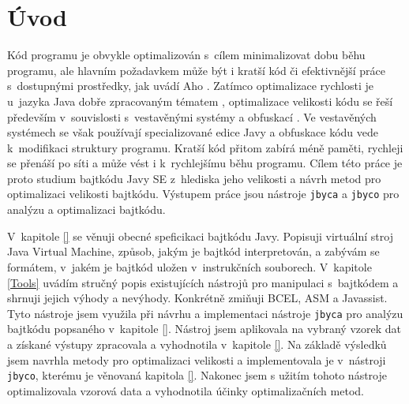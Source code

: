 \chapter{Úvod}\label{Introduction}


Kód programu je obvykle optimalizován s~cílem minimalizovat dobu běhu programu, ale hlavním požadavkem může být i kratší kód či efektivnější práce s~dostupnými prostředky, jak uvádí Aho \cite{}. Zatímco optimalizace rychlosti je u~jazyka Java dobře zpracovaným tématem \cite{}, optimalizace velikosti kódu se řeší především v~souvislosti s~vestavěnými systémy \cite{} a obfuskací \cite{}. Ve vestavěných systémech se však používají specializované edice Javy a obfuskace kódu vede k~modifikaci struktury programu. Kratší kód přitom zabírá méně paměti, rychleji se přenáší po síti a může vést i k~rychlejšímu běhu programu. Cílem této práce je proto studium bajtkódu Javy SE z~hlediska jeho velikosti a návrh metod pro optimalizaci velikosti bajtkódu. Výstupem práce jsou nástroje \texttt{jbyca} a \texttt{jbyco} pro analýzu a optimalizaci bajtkódu.

V~kapitole \ref{} se věnuji obecné speficikaci bajtkódu Javy. Popisuji virtuální stroj Java Virtual Machine, způsob, jakým je bajtkód interpretován, a zabývám se formátem, v~jakém je bajtkód uložen v~instrukčních souborech. V~kapitole \ref{Tools} uvádím stručný popis existujících nástrojů pro manipulaci s~bajtkódem a shrnuji jejich výhody a nevýhody. Konkrétně zmiňuji BCEL, ASM a Javassist. Tyto nástroje jsem využila při návrhu a implementaci nástroje \texttt{jbyca} pro analýzu bajtkódu popsaného v~kapitole \ref{}. Nástroj jsem aplikovala na vybraný vzorek dat a získané výstupy zpracovala a vyhodnotila v~kapitole \ref{}. Na základě výsledků jsem navrhla metody pro optimalizaci velikosti a implementovala je v~nástroji \texttt{jbyco}, kterému je věnovaná kapitola \ref{}. Nakonec jsem s užitím tohoto nástroje optimalizovala vzorová data a vyhodnotila účinky optimalizačních metod.



